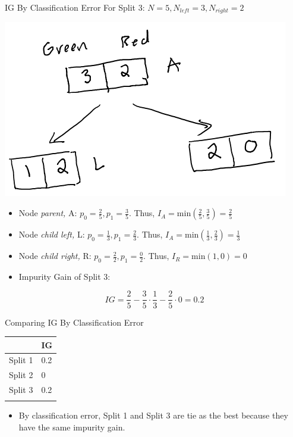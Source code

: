 \documentclass[
  ignorenonframetext,
]{beamer}
\providecommand{\tightlist}{%
  \setlength{\itemsep}{0pt}\setlength{\parskip}{0pt}}
\begin{document}
\begin{frame}{IG By Classification Error}
\label{ig-by-classification-error-2}
For Split 3: \(N = 5, N_{left} =3, N_{right} = 2\)

\includegraphics{images/im2.png}

\begin{itemize}
\item
  Node \emph{parent,} A: \(p_0 = \frac{2}{5}, p_1 = \frac{3}{5}\). Thus,
  \(I_{A} = \text{min}(\frac{2}{5}, \frac{3}{5}) = \frac{2}{5}\)
\item
  Node \emph{child left,} L: \(p_0 = \frac{1}{3}, p_1 = \frac{2}{3}\).
  Thus, \(I_{A} = \text{min}(\frac{1}{3}, \frac{2}{3}) = \frac{1}{3}\)
\item
  Node \emph{child right,} R: \(p_0 = \frac{2}{2}, p_1 = \frac{0}{2}\).
  Thus, \(I_{R} = \text{min}(1,0) = 0\)
\item
  Impurity Gain of Split 3:
\end{itemize}

\[IG = \frac{2}{5} - \frac{3}{5} \cdot \frac{1}{3}-\frac{2}{5} \cdot 0 = 0.2\]
\end{frame}

\begin{frame}{Comparing IG By Classification Error}
\label{comparing-ig-by-classification-error}
\begin{longtable}[]{@{}ll@{}}
\toprule\noalign{}
& IG \\
\midrule\noalign{}
\endhead
Split 1 & 0.2 \\
Split 2 & 0 \\
Split 3 & 0.2 \\
\bottomrule\noalign{}
\end{longtable}

\begin{itemize}
\tightlist
\item
  By classification error, Split 1 and Split 3 are tie as the best
  because they have the same impurity gain.
\end{itemize}
\end{frame}
\end{document}
